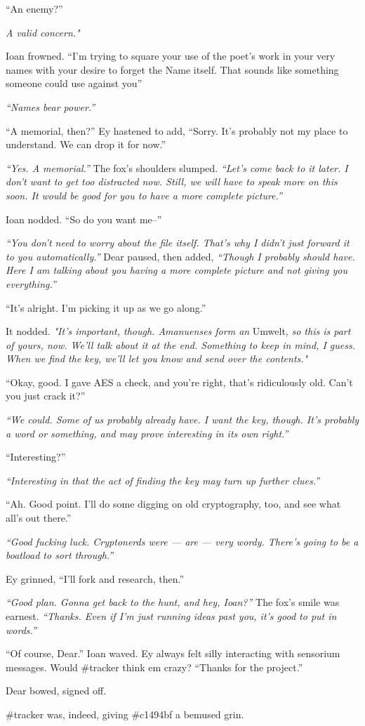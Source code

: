 ``An enemy?''

\emph{A valid concern."}

Ioan frowned. ``I'm trying to square your use of the poet's work in your very names with your desire to forget the Name itself. That sounds like something someone could use against you''

\emph{``Names bear power.''}

``A memorial, then?'' Ey hastened to add, ``Sorry. It's probably not my place to understand. We can drop it for now.''

\emph{``Yes. A memorial.''} The fox's shoulders slumped. \emph{``Let's come back to it later. I don't want to get too distracted now. Still, we will have to speak more on this soon. It would be good for you to have a more complete picture.''}

Ioan nodded. ``So do you want me--''

\emph{``You don't need to worry about the file itself. That's why I didn't just forward it to you automatically.''} Dear paused, then added, \emph{``Though I probably should have. Here I am talking about you having a more complete picture and not giving you everything.''}

``It's alright. I'm picking it up as we go along.''

It nodded. \emph{"It's important, though. Amanuenses form an} Umwelt, \emph{so this is part of yours, now. We'll talk about it at the end. Something to keep in mind, I guess. When we find the key, we'll let you know and send over the contents."}

``Okay, good. I gave AES a check, and you're right, that's ridiculously old. Can't you just crack it?''

\emph{``We could. Some of us probably already have. I want the key, though. It's probably a word or something, and may prove interesting in its own right.''}

``Interesting?''

\emph{``Interesting in that the act of finding the key may turn up further clues.''}

``Ah. Good point. I'll do some digging on old cryptography, too, and see what all's out there.''

\emph{``Good fucking luck. Cryptonerds were — are — very wordy. There's going to be a boatload to sort through.''}

Ey grinned, ``I'll fork and research, then.''

\emph{``Good plan. Gonna get back to the hunt, and hey, Ioan?''} The fox's smile was earnest. \emph{``Thanks. Even if I'm just running ideas past you, it's good to put in words.''}

``Of course, Dear.'' Ioan waved. Ey always felt silly interacting with sensorium messages. Would \#tracker think em crazy? ``Thanks for the project.''

Dear bowed, signed off.

\#tracker was, indeed, giving \#c1494bf a bemused grin.
